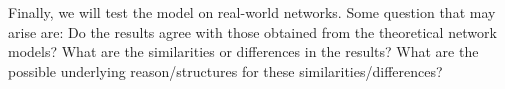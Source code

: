 \documentclass[11 pt , letterpaper , twoside , openright]{book}
\newenvironment{abstract}%
{\cleardoublepage\null \vfill\begin{center}\bfseries \abstractname \end{center}}{\vfill\null}
\begin{document}
\begin{abstract}
\newline
Finally, we will test the model on real-world networks. Some question that may arise are: Do the results agree with those obtained from the theoretical network models? What are the similarities or differences in the results? What are the possible underlying reason/structures for these similarities/differences?
\setcounter{abstractpage}{\value{page}}
\end{abstract}


\begin{abstract}
\thispagestyle{plain}
\setcounter{page}{\value{abstractpage}}


\end{abstract}
\end{document}
